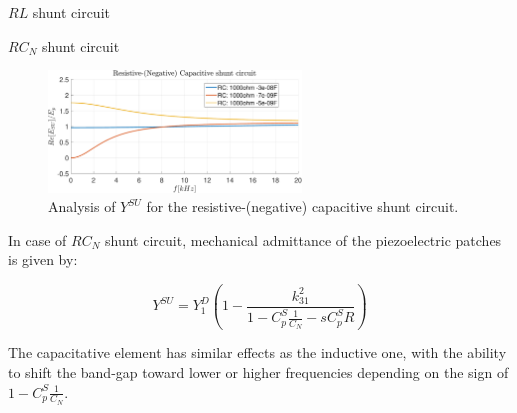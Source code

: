 \begin{frame}{$RL$ shunt circuit}
{    }


\end{frame}



\begin{frame}{$RC_N$ shunt circuit}

    \begin{figure}[H]
        \centering
        \includegraphics[width=0.6\textwidth]{./img/MATLAB/Y_SU_Resistive-(Negative) Capacitive shunt circuit.pdf}
        \caption{Analysis of $Y^{SU}$ for the resistive-(negative) capacitive shunt circuit.}
    \end{figure}

    In case of $RC_N$ shunt circuit, mechanical admittance of the piezoelectric patches is given by:

    \begin{equation}
        Y^{SU} = Y_1^D \left( 1 - \frac{k_{31}^2}{1 - C_p^S \frac{1}{C_N} - s C_p^S R} \right)
    \end{equation}

    The capacitative element has similar effects as the inductive one, with the ability to shift the band-gap toward lower or higher frequencies depending on the sign of $1 - C_p^S \frac{1}{C_N}$.

\end{frame}




